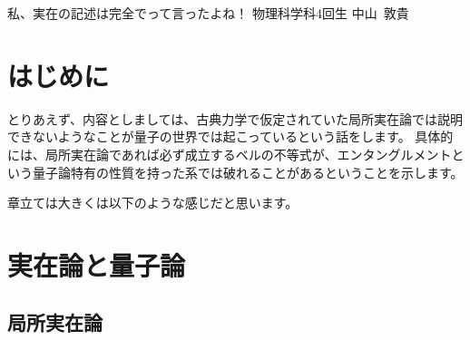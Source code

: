 \documentclass[10pt,b5paper,papersize,dvipdfmx]{jsbook}
\begin{document}

\newcommand\karizu[1]{\begin{center}（図：#1）\end{center}}

\newif\ifsecI
\newif\ifsecII

\secItrue
\secIItrue


\kaishititle%
  {私、実在の記述は完全でって言ったよね！}%
  {物理科学科4回生}%
  {中山~敦貴}%


\section*{はじめに}
とりあえず、内容としましては、古典力学で仮定されていた局所実在論では説明できないようなことが量子の世界では起こっているという話をします。
具体的には、局所実在論であれば必ず成立するベルの不等式が、エンタングルメントという量子論特有の性質を持った系では破れることがあるということを示します。\par
章立ては大きくは以下のような感じだと思います。


\ifsecI
\section{実在論と量子論}

%
\subsection{局所実在論} %
\end{document}
